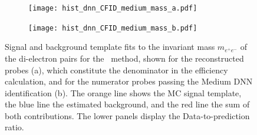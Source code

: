 \begin{figure}[htbp]
  \centering
  \begin{subfigure}[b]{0.49\linewidth}
    \texttt{[image: hist\_dnn\_CFID\_medium\_mass\_a.pdf]}
    \caption{}
    \label{fig:zmass_fit_dnn_medium_a}
  \end{subfigure}
  \begin{subfigure}[b]{0.49\linewidth}
    \texttt{[image: hist\_dnn\_CFID\_medium\_mass\_b.pdf]}
    \caption{}
    \label{fig:zmass_fit_dnn_medium_b}
  \end{subfigure}
  \caption{
    Signal and background template fits to the invariant mass $m_{e^{+}e^{-}}$ of the di-electron pairs for the \zmass\ method, shown for the reconstructed probes (a), which constitute the denominator in the efficiency calculation, and for the numerator probes passing the Medium DNN identification (b). The orange line shows the MC signal template, the blue line the estimated background, and the red line the sum of both contributions. The lower panels display the Data-to-prediction ratio.}
  \label{fig:zmass_fit_dnn_medium}
\end{figure}

